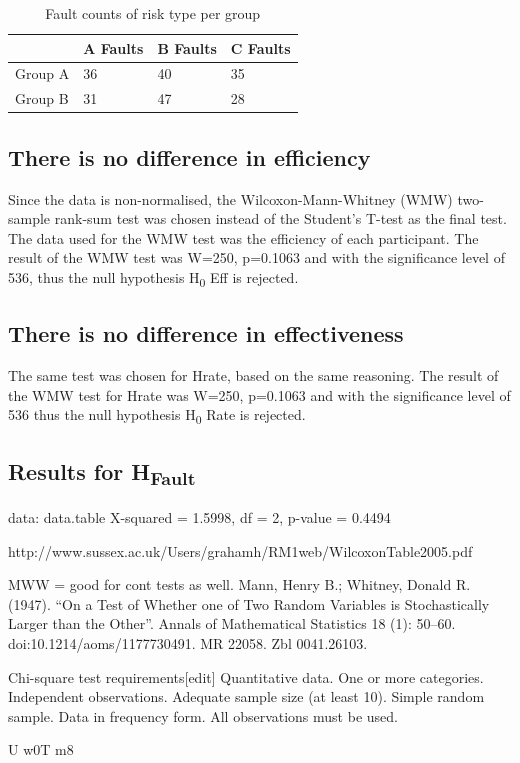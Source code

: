 \documentclass[10pt,twocolumn]{article}
\begin{document}
\begin{table}
	\centering
	\begin{tabular}[Ht]{| l | l | l | l |}
	\hline
	 & A Faults & B Faults & C Faults  \\
	\hline
	Group A & 36 & 40 & 35 \\
	\hline
	Group B & 31 & 47 & 28 \\
	\hline
	\end{tabular}
	\caption{Fault counts of risk type per group}
\end{table}


\subsection{There is no difference in efficiency}
Since the data is non-normalised, the Wilcoxon-Mann-Whitney (WMW) two-sample rank-sum test was chosen instead of the Student's T-test as the final test. The data used for the WMW test was the efficiency of each participant. The result of the WMW test was W=250, p=0.1063 and with the significance level of 536, thus the null hypothesis H\textsubscript{0} Eff is rejected. 

\subsection{There is no difference in effectiveness}
The same test was chosen for Hrate, based on the same reasoning. The result of the WMW test for Hrate was W=250, p=0.1063 and with the significance level of 536 thus the null hypothesis H\textsubscript{0} Rate is rejected. 


\subsection{Results for H\textsubscript{Fault}}

data:  data.table
X-squared = 1.5998, df = 2, p-value = 0.4494

http://www.sussex.ac.uk/Users/grahamh/RM1web/WilcoxonTable2005.pdf



MWW = good for cont tests as well.
 Mann, Henry B.; Whitney, Donald R. (1947). ``On a Test of Whether one of Two Random Variables is Stochastically Larger than the Other''. Annals of Mathematical Statistics 18 (1): 50–60. doi:10.1214/aoms/1177730491. MR 22058. Zbl 0041.26103.












Chi-square test requirements[edit]
Quantitative data.
One or more categories.
Independent observations.
Adequate sample size (at least 10).
Simple random sample.
Data in frequency form.
All observations must be used.




U w0T m8
\end{document}
